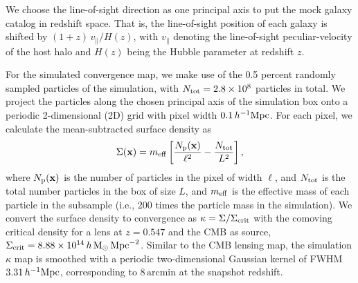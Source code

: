 \documentclass[preprint]{aastex701}
\newcommand{\hinvMpc}{h^{-1}{\rm Mpc}}
\begin{document}
We choose the line-of-sight direction as one principal axis to put the mock galaxy catalog in redshift space. That is, the line-of-sight position of each galaxy is shifted by $(1+z)\,v_{\parallel}/H(z)$, with $v_{\parallel}$ denoting the line-of-sight peculiar-velocity of the host halo and $H(z)$ being the Hubble parameter at redshift $z$. 


For the simulated convergence map, we make use of the 0.5 percent randomly sampled particles of the simulation, with $N_{\rm tot}=2.8\times10^{8}$ particles in total.
We project the particles along the chosen principal axis of the simulation box 
onto a periodic 2-dimensional (2D) grid with pixel width $0.1\,\hinvMpc$. For each pixel, we calculate the mean-subtracted surface density as
\begin{equation}
    \Sigma(\mathbf{x})=m_{\rm eff}\left[\frac{N_{\rm p}(\mathbf{x})}{\ell^{2}}
-\frac{N_{\rm tot}}{L^{2}}\right],
\end{equation}
where $N_{\rm p}(\mathbf{x})$ is the number of particles in the pixel of width $\ell$, and $N_{\rm tot}$ is the total number particles in the box of size $L$, and $m_{\rm eff}$ is the effective mass of each particle in the subsample (i.e., 200 times the particle mass in the simulation). We convert the surface density to convergence as $\kappa=\Sigma/\Sigma_{\rm crit}$ with the comoving critical density for a lens at $z=0.547$ and the CMB as source, $\Sigma_{\rm crit}=8.88\times10^{14}\,h\,\mathrm{M}_{\odot}\,\mathrm{Mpc}^{-2}$.
Similar to the CMB lensing map, the simulation$\kappa$ map is smoothed with a periodic two-dimensional Gaussian kernel of FWHM $3.31\,\hinvMpc$, corresponding to $8\,\mathrm{arcmin}$ at the snapshot redshift.
\end{document}
